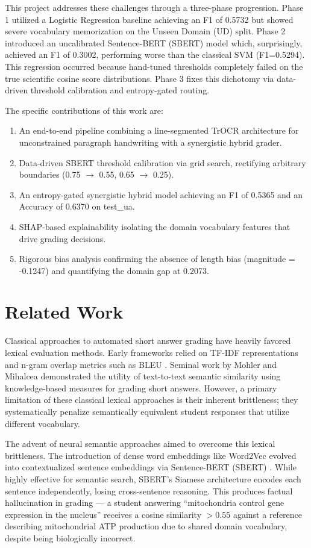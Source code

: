 \documentclass[conference]{IEEEtran}
\begin{document}
This project addresses these challenges through a three-phase progression. Phase 1 utilized a Logistic Regression baseline achieving an F1 of 0.5732 but showed severe vocabulary memorization on the Unseen Domain (UD) split. Phase 2 introduced an uncalibrated Sentence-BERT (SBERT) model which, surprisingly, achieved an F1 of 0.3002, performing worse than the classical SVM (F1=0.5294). This regression occurred because hand-tuned thresholds completely failed on the true scientific cosine score distributions. Phase 3 fixes this dichotomy via data-driven threshold calibration and entropy-gated routing.

The specific contributions of this work are:
\begin{enumerate}
    \item An end-to-end pipeline combining a line-segmented TrOCR architecture for unconstrained paragraph handwriting with a synergistic hybrid grader.
    \item Data-driven SBERT threshold calibration via grid search, rectifying arbitrary boundaries (0.75 $\to$ 0.55, 0.65 $\to$ 0.25).
    \item An entropy-gated synergistic hybrid model achieving an F1 of 0.5365 and an Accuracy of 0.6370 on test\_ua.
    \item SHAP-based explainability isolating the domain vocabulary features that drive grading decisions.
    \item Rigorous bias analysis confirming the absence of length bias (magnitude = -0.1247) and quantifying the domain gap at 0.2073.
\end{enumerate}

\section{Related Work}

Classical approaches to automated short answer grading have heavily favored lexical evaluation methods. Early frameworks relied on TF-IDF representations \cite{salton1988term} and n-gram overlap metrics such as BLEU \cite{papineni2002bleu}. Seminal work by Mohler and Mihalcea \cite{mohler2009text} demonstrated the utility of text-to-text semantic similarity using knowledge-based measures for grading short answers. However, a primary limitation of these classical lexical approaches is their inherent brittleness; they systematically penalize semantically equivalent student responses that utilize different vocabulary.

The advent of neural semantic approaches aimed to overcome this lexical brittleness. The introduction of dense word embeddings like Word2Vec \cite{mikolov2013efficient} evolved into contextualized sentence embeddings via Sentence-BERT (SBERT) \cite{reimers2019sentence}. While highly effective for semantic search, SBERT's Siamese architecture encodes each sentence independently, losing cross-sentence reasoning. This produces factual hallucination in grading — a student answering ``mitochondria control gene expression in the nucleus'' receives a cosine similarity $>0.55$ against a reference describing mitochondrial ATP production due to shared domain vocabulary, despite being biologically incorrect.
\end{document}
